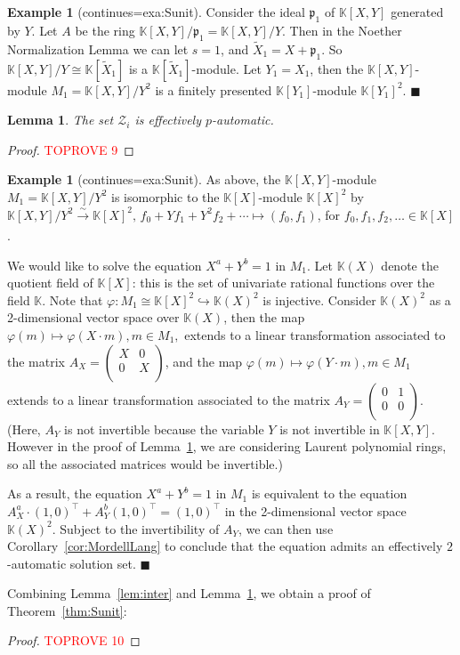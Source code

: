 \documentclass[a4paper,UKenglish,cleveref, autoref, thm-restate]{lipics-v2021}
\newcommand{\K}{\mathbb{K}}
\newcommand{\mZ}{\mathcal{Z}}
\newcommand{\frp}{\mathfrak{p}}
\newtheorem{lem}[thrm]{Lemma}
\theoremstyle{definition}
\theoremstyle{definition}
\newtheorem{exmpl}[thrm]{Example}
\theoremstyle{definition}
\begin{document}
\renewcommand\thmcontinues[1]{continued}
\begin{exmpl}[continues=exa:Sunit]
Consider the ideal $\frp_1$ of $\K[X, Y]$ generated by $Y$.
Let $A$ be the ring $\K[X, Y]/\frp_1 = \K[X, Y]/Y$.
Then in the Noether Normalization Lemma we can let $s = 1$, and $\widetilde{X}_1 = X + \frp_1$. So $\K[X, Y]/Y \cong \K[\widetilde{X}_1]$ is a $\K[\widetilde{X}_1]$-module.
Let $Y_1 = X_1$, then the $\K[X, Y]$-module $M_1 = \K[X, Y]/Y^2$ is a finitely presented $\K[Y_1]$-module $\K[Y_1]^2$.
\hfill $\blacksquare$
\end{exmpl}

\begin{lem}\label{lem:primary}
    The set $\mZ_i$ is effectively $p$-automatic.
\end{lem}
\begin{proof}\textcolor{red}{TOPROVE 9}\end{proof}

\renewcommand\thmcontinues[1]{continued}
\begin{exmpl}[continues=exa:Sunit]
As above, the $\K[X, Y]$-module $M_1 = \K[X, Y]/Y^2$ is isomorphic to the $\K[X]$-module $\K[X]^2$ by $\K[X, Y]/Y^2 \xrightarrow[]{\sim} \K[X]^2, \, f_0 + Y f_1 + Y^2 f_2 + \cdots \mapsto (f_0, f_1)$, for $f_0, f_1, f_2, \ldots \in \K[X]$.

We would like to solve the equation $X^a + Y^b = 1$ in $M_1$.
Let $\K(X)$ denote the quotient field of $\K[X]$: this is the set of univariate rational functions over the field $\K$.
Note that $\varphi: M_1 \cong \K[X]^2 \hookrightarrow \K(X)^2$ is injective.
Consider $\K(X)^2$ as a 2-dimensional vector space over $\K(X)$, then the map $\varphi(m) \mapsto \varphi(X \cdot m), m \in M_1,$ extends to a linear transformation associated to the matrix 
$
A_X =
\begin{pmatrix}
    X & 0 \\
    0 & X \\
\end{pmatrix}
$,
and the map $\varphi(m) \mapsto \varphi(Y \cdot m), m \in M_1$ extends to a linear transformation associated to the matrix 
$
A_Y =
\begin{pmatrix}
    0 & 1 \\
    0 & 0 \\
\end{pmatrix}
$.
(Here, $A_Y$ is not invertible because the variable $Y$ is not invertible in $\K[X, Y]$. However in the proof of Lemma~\ref{lem:primary}, we are considering Laurent polynomial rings, so all the associated matrices would be invertible.)

As a result, the equation $X^a + Y^b = 1$ in $M_1$ is equivalent to the equation
$
A_X^a \cdot (1, 0)^{\top} + A_Y^b (1, 0)^{\top} = (1, 0)^{\top}
$
in the 2-dimensional vector space $\K(X)^2$.
Subject to the invertibility of $A_Y$, we can then use Corollary~\ref{cor:MordellLang} to conclude that the equation admits an effectively $2$-automatic solution set.
\hfill $\blacksquare$
\end{exmpl}

Combining Lemma~\ref{lem:inter} and Lemma~\ref{lem:primary}, we obtain a proof of Theorem~\ref{thm:Sunit}:
\begin{proof}\textcolor{red}{TOPROVE 10}\end{proof}


\end{document}
